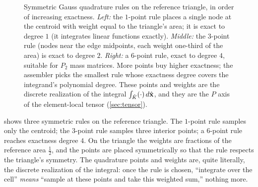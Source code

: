 \begin{figure}[t]
\centering
{}
\caption[Gauss quadrature points on the reference triangle]{Symmetric Gauss
quadrature rules on the reference triangle, in order of increasing exactness.
\emph{Left:} the $1$-point rule places a single node at the centroid with weight
equal to the triangle's area; it is exact to degree $1$ (it integrates linear
functions exactly). \emph{Middle:} the $3$-point rule (nodes near the edge midpoints,
each weight one-third of the area) is exact to degree $2$. \emph{Right:} a $6$-point
rule, exact to degree $4$, suitable for $P_2$ mass matrices. More points buy higher
exactness; the assembler picks the smallest rule whose exactness degree covers the
integrand's polynomial degree. These points and weights are the discrete realization
of the integral $\int_{\hat K}(\cdot)\,d\hat{\mathbf{x}}$, and they are the $P$ axis of the
element-local tensor (\cref{sec:tensor}).}
\label{fig:quadpts}
\end{figure}

 shows three symmetric rules on the reference triangle. The
$1$-point rule samples only the centroid; the $3$-point rule samples three interior
points; a $6$-point rule reaches exactness degree $4$. On the triangle the weights are
fractions of the reference area $\tfrac12$, and the points are placed symmetrically so
that the rule respects the triangle's symmetry. The quadrature points and weights are,
quite literally, the discrete realization of the integral: once the rule is chosen,
``integrate over the cell'' \emph{means} ``sample at these points and take this
weighted sum,'' nothing more.


